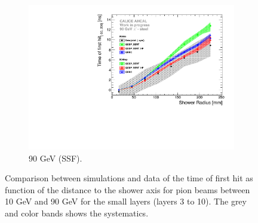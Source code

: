 \begin{figure}[htbp!]
\begin{subfigure}[t]{0.5\textwidth}
		\includegraphics[width=1\textwidth]{chap5/fig_AHCAL_timing/Pions/ComparisonToSim/Time_Radius_90GeV_SSF.pdf}
		\caption{90 GeV (SSF).} \label{fig:Radius_SSF_SimData_90GeV}
	\end{subfigure}
	\caption{Comparison between simulations and data of the time of first hit as function of the distance to the shower axis for pion beams between 10 GeV and 90 GeV for the small layers (layers 3 to 10). The grey and color bands shows the systematics.}
	\label{fig:Radius_SSF_SimData_Comparison}
\end{figure}


